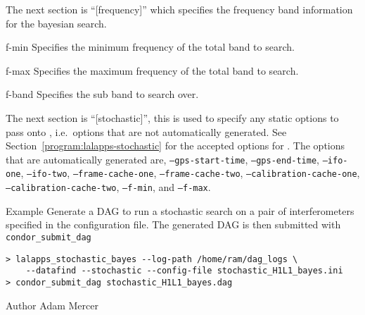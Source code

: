 \begin{entry}
The next section is ``[frequency]'' which specifies the frequency band
information for the bayesian search.
\begin{entry}
\item[f-min]
Specifies the minimum frequency of the total band to search.
\item[f-max]
Specifies the maximum frequency of the total band to search.
\item[f-band]
Specifies the sub band to search over.
\end{entry}

The next section is ``[stochastic]'', this is used to specify any static
options to pass onto , i.e.~options that are
not automatically generated. See
Section~\ref{program:lalapps-stochastic} for the accepted options for
. The options that are automatically generated
are, \texttt{--gps-start-time}, \texttt{--gps-end-time},
\texttt{--ifo-one}, \texttt{--ifo-two}, \texttt{--frame-cache-one},
\texttt{--frame-cache-two}, \texttt{--calibration-cache-one},\\
\texttt{--calibration-cache-two}, \texttt{--f-min}, and
\texttt{--f-max}.

\item[Example]
Generate a DAG to run a stochastic search on a pair of interferometers
specified in the configuration file. The generated DAG is then submitted
with \texttt{condor\_submit\_dag}

\begin{verbatim}
> lalapps_stochastic_bayes --log-path /home/ram/dag_logs \
    --datafind --stochastic --config-file stochastic_H1L1_bayes.ini
> condor_submit_dag stochastic_H1L1_bayes.dag
\end{verbatim}

\item[Author]
Adam Mercer
\end{entry}
